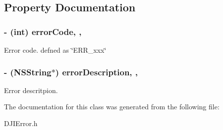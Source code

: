\subsection{Property Documentation}
\hypertarget{interface_d_j_i_error_a92c9fa51ec6acea8d7dad2dd46346372}{
\subsubsection[{error\+Code}]{\setlength{\rightskip}{0pt plus 5cm}-\/ (int) error\+Code\hspace{0.3cm}{\ttfamily [read]}, {\ttfamily [nonatomic]}, {\ttfamily [assign]}}}\label{interface_d_j_i_error_a92c9fa51ec6acea8d7dad2dd46346372}
Error code. defned as \char`\"{}\+E\+R\+R\+\_\+xxx\char`\"{} \hypertarget{interface_d_j_i_error_a6f210d906aad9322560db1abec9e2e51}{
\subsubsection[{error\+Description}]{\setlength{\rightskip}{0pt plus 5cm}-\/ (N\+S\+String$\ast$) error\+Description\hspace{0.3cm}{\ttfamily [read]}, {\ttfamily [nonatomic]}, {\ttfamily [assign]}}}\label{interface_d_j_i_error_a6f210d906aad9322560db1abec9e2e51}
Error descritpion. 

The documentation for this class was generated from the following file\+:\begin{DoxyCompactItemize}
\item 
D\+J\+I\+Error.\+h\end{DoxyCompactItemize}

